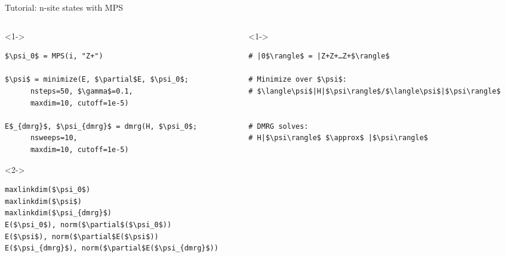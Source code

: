 \begin{frame}[fragile]{Tutorial: n-site states with MPS}


\begin{columns}

\begin{column}{5cm}

\begin{onlyenv}<1->

\begin{lstlisting}[language=JuliaLocal, style=julia, mathescape, basicstyle=\small]
$\psi_0$ = MPS(i, "Z+")

$\psi$ = minimize(E, $\partial$E, $\psi_0$;
      nsteps=50, $\gamma$=0.1,
      maxdim=10, cutoff=1e-5)

E$_{dmrg}$, $\psi_{dmrg}$ = dmrg(H, $\psi_0$;
      nsweeps=10,
      maxdim=10, cutoff=1e-5)
\end{lstlisting}

\end{onlyenv}

\begin{onlyenv}<2->

\begin{lstlisting}[language=JuliaLocal, style=julia, mathescape, basicstyle=\small]
maxlinkdim($\psi_0$)
maxlinkdim($\psi$)
maxlinkdim($\psi_{dmrg}$)
E($\psi_0$), norm($\partial$($\psi_0$))
E($\psi$), norm($\partial$E($\psi$))
E($\psi_{dmrg}$), norm($\partial$E($\psi_{dmrg}$))
\end{lstlisting}

\end{onlyenv}

\end{column}

\begin{column}{5.5cm}

\begin{onlyenv}<1->

\begin{lstlisting}[style=julia, numbers=none, mathescape, basicstyle=\small]
# |0$\rangle$ = |Z+Z+…Z+$\rangle$

# Minimize over $\psi$:
# $\langle\psi$|H|$\psi\rangle$/$\langle\psi$|$\psi\rangle$


# DMRG solves:
# H|$\psi\rangle$ $\approx$ |$\psi\rangle$
 \end{lstlisting}

\end{onlyenv}


\end{column}
\end{columns}
\end{frame}
